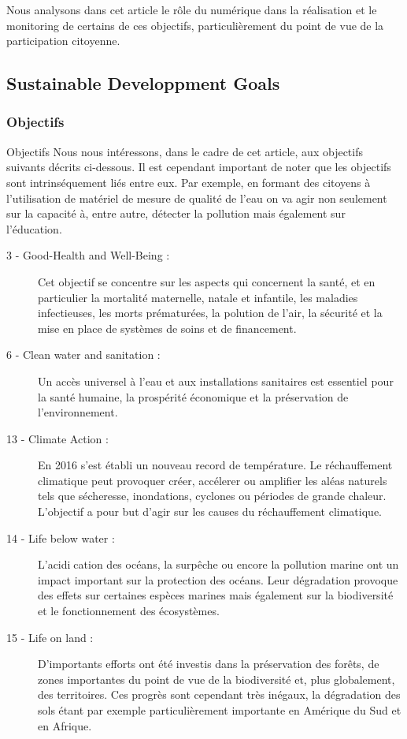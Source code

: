 \documentclass[a4paper,11pt,titlepage]{article}
\begin{document}
		Nous analysons dans cet article le rôle du numérique dans la réalisation et le monitoring de certains de ces objectifs, particulièrement du point de vue de la participation citoyenne.
		 
		\subsection{Sustainable Developpment Goals}
			\subsubsection{Objectifs}
				Objectifs Nous nous intéressons, dans le cadre de cet article, aux objectifs suivants décrits ci-dessous. Il est cependant important de noter que les objectifs sont intrinséquement liés entre eux. Par exemple, en formant des citoyens à l'utilisation de matériel de mesure de qualité de l'eau on va agir non seulement sur la capacité à, entre autre, détecter la pollution mais également sur l'éducation.
				\begin{description}
					\item[ 3 - Good-Health and Well-Being :] Cet objectif se concentre sur les aspects qui	concernent la santé, et en particulier la mortalité maternelle, natale et infantile, les maladies infectieuses, les morts prématurées, la polution de l'air, la sécurité et la mise en place de systèmes de soins et de financement.
					\item[ 6 - Clean water and sanitation :] Un accès universel à l'eau et aux installations sanitaires est essentiel pour la santé humaine, la prospérité économique et la préservation de l'environnement.
					\item[13 - Climate Action :] En 2016 s'est établi un nouveau record de température. Le réchauffement climatique peut provoquer créer, accélerer ou amplifier les aléas	naturels tels que sécheresse, inondations, cyclones ou périodes de grande chaleur. L'objectif a pour but d'agir sur les causes du réchauffement climatique.
					\item[14 - Life below water :] L'acidication des océans, la surpêche ou encore la pollution marine ont un impact important sur la protection des océans. Leur dégradation provoque des effets sur certaines espèces marines mais également sur la biodiversité et le fonctionnement des écosystèmes.
					\item[15 - Life on land :] D'importants efforts ont été investis dans la préservation des forêts, de zones importantes du point de vue de la biodiversité et, plus globalement, des territoires. Ces progrès sont cependant très inégaux, la dégradation des sols étant par exemple particulièrement importante en Amérique du Sud et en Afrique.
				\end{description}
\end{document}
